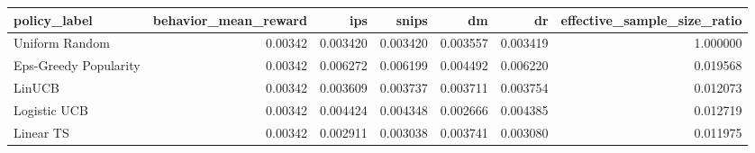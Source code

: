 \begin{tabular}{lrrrrrr}
\toprule
         policy\_label &  behavior\_mean\_reward &      ips &    snips &       dm &       dr &  effective\_sample\_size\_ratio \\
\midrule
       Uniform Random &               0.00342 & 0.003420 & 0.003420 & 0.003557 & 0.003419 &                     1.000000 \\
Eps-Greedy Popularity &               0.00342 & 0.006272 & 0.006199 & 0.004492 & 0.006220 &                     0.019568 \\
               LinUCB &               0.00342 & 0.003609 & 0.003737 & 0.003711 & 0.003754 &                     0.012073 \\
         Logistic UCB &               0.00342 & 0.004424 & 0.004348 & 0.002666 & 0.004385 &                     0.012719 \\
            Linear TS &               0.00342 & 0.002911 & 0.003038 & 0.003741 & 0.003080 &                     0.011975 \\
\bottomrule
\end{tabular}
